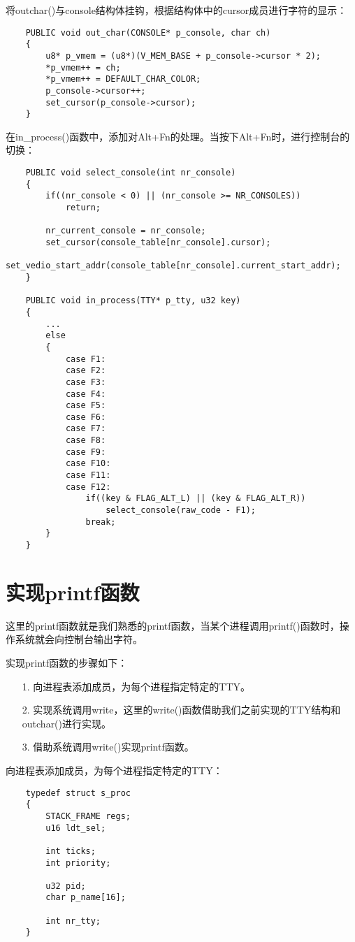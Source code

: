 \documentclass[a4paper,left=2.5cm,right=2.5cm,11pt]{article}
\begin{document}
	将outchar()与console结构体挂钩，根据结构体中的cursor成员进行字符的显示：
	\begin{lstlisting}
	PUBLIC void out_char(CONSOLE* p_console, char ch)
	{
		u8* p_vmem = (u8*)(V_MEM_BASE + p_console->cursor * 2);
		*p_vmem++ = ch;
		*p_vmem++ = DEFAULT_CHAR_COLOR;
		p_console->cursor++;
		set_cursor(p_console->cursor);
	}
	\end{lstlisting}

	在in\_process()函数中，添加对Alt+Fn的处理。当按下Alt+Fn时，进行控制台的切换：
	\begin{lstlisting}
	PUBLIC void select_console(int nr_console)
	{
		if((nr_console < 0) || (nr_console >= NR_CONSOLES))
			return;

		nr_current_console = nr_console;
		set_cursor(console_table[nr_console].cursor);
		set_vedio_start_addr(console_table[nr_console].current_start_addr);
	}

	PUBLIC void in_process(TTY* p_tty, u32 key)
	{
		...
		else
		{
			case F1:
			case F2:
			case F3:
			case F4:
			case F5:
			case F6:
			case F7:
			case F8:
			case F9:
			case F10:
			case F11:
			case F12:
				if((key & FLAG_ALT_L) || (key & FLAG_ALT_R))
					select_console(raw_code - F1);
				break;
		}
	}
	\end{lstlisting}	

\section{实现printf函数}
	这里的printf函数就是我们熟悉的printf函数，当某个进程调用printf()函数时，操作系统就会向控制台输出字符。\par

	实现printf函数的步骤如下：
	\begin{itemize}
		\item[1.] 向进程表添加成员，为每个进程指定特定的TTY。
		\item[2.] 实现系统调用write，这里的write()函数借助我们之前实现的TTY结构和outchar()进行实现。
		\item[3.] 借助系统调用write()实现printf函数。
	\end{itemize}

	向进程表添加成员，为每个进程指定特定的TTY：
	\begin{lstlisting}
	typedef struct s_proc
	{
		STACK_FRAME regs;
		u16 ldt_sel;

		int ticks;
		int priority;

		u32 pid;
		char p_name[16];

		int nr_tty;
	}
	\end{lstlisting}
\end{document}

